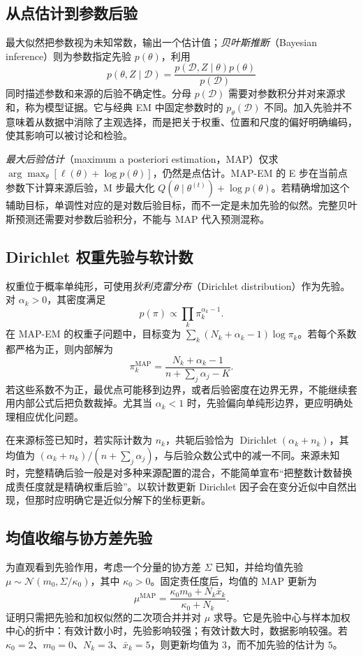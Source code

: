 \documentclass[UTF8,12pt,a4paper,fontset=fandol]{ctexart}
\begin{document}
\subsection{从点估计到参数后验}
最大似然把参数视为未知常数，输出一个估计值；\emph{贝叶斯推断}（Bayesian inference）则为参数指定先验 $p(\theta)$，利用
\[
p(\theta,Z\mid\mathcal D)=\frac{p(\mathcal D,Z\mid\theta)p(\theta)}{p(\mathcal D)}
\]
同时描述参数和来源的后验不确定性。分母 $p(\mathcal D)$ 需要对参数积分并对来源求和，称为模型证据。它与经典 EM 中固定参数时的 $p_\theta(\mathcal D)$ 不同。加入先验并不意味着从数据中消除了主观选择，而是把关于权重、位置和尺度的偏好明确编码，使其影响可以被讨论和检验。

\emph{最大后验估计}（maximum a posteriori estimation，MAP）仅求 $\arg\max_\theta[\ell(\theta)+\log p(\theta)]$，仍然是点估计。MAP-EM 的 E 步在当前点参数下计算来源后验，M 步最大化 $Q(\theta\mid\theta^{(t)})+\log p(\theta)$。若精确增加这个辅助目标，单调性对应的是对数后验目标，而不一定是未加先验的似然。完整贝叶斯预测还需要对参数后验积分，不能与 MAP 代入预测混称。

\subsection{Dirichlet 权重先验与软计数}
权重位于概率单纯形，可使用\emph{狄利克雷分布}（Dirichlet distribution）作为先验。对 $\alpha_k>0$，其密度满足
\[
p(\pi)\propto\prod_k\pi_k^{\alpha_k-1}.
\]
在 MAP-EM 的权重子问题中，目标变为 $\sum_k(N_k+\alpha_k-1)\log\pi_k$。若每个系数都严格为正，则内部解为
\begin{equation}
\pi_k^{\mathrm{MAP}}=\frac{N_k+\alpha_k-1}{n+\sum_j\alpha_j-K}.
\label{eq:gmm-map-weights}
\end{equation}
若这些系数不为正，最优点可能移到边界，或者后验密度在边界无界，不能继续套用内部公式后把负数裁掉。尤其当 $\alpha_k<1$ 时，先验偏向单纯形边界，更应明确处理相应优化问题。

在来源标签已知时，若实际计数为 $n_k$，共轭后验恰为 $\operatorname{Dirichlet}(\alpha_k+n_k)$，其均值为 $(\alpha_k+n_k)/(n+\sum_j\alpha_j)$，与后验众数公式中的减一不同。来源未知时，完整精确后验一般是对多种来源配置的混合，不能简单宣布“把整数计数替换成责任度就是精确权重后验”。以软计数更新 Dirichlet 因子会在变分近似中自然出现，但那时应明确它是近似分解下的坐标更新。

\subsection{均值收缩与协方差先验}
为直观看到先验作用，考虑一个分量的协方差 $\Sigma$ 已知，并给均值先验 $\mu\sim\mathcal N(m_0,\Sigma/\kappa_0)$，其中 $\kappa_0>0$。固定责任度后，均值的 MAP 更新为
\[
\mu^{\mathrm{MAP}}=\frac{\kappa_0m_0+N_k\bar x_k}{\kappa_0+N_k}.
\]
证明只需把先验和加权似然的二次项合并并对 $\mu$ 求导。它是先验中心与样本加权中心的折中：有效计数小时，先验影响较强；有效计数大时，数据影响较强。若 $\kappa_0=2$、$m_0=0$、$N_k=3$、$\bar x_k=5$，则更新均值为 $3$，而不加先验的估计为 $5$。
\end{document}
